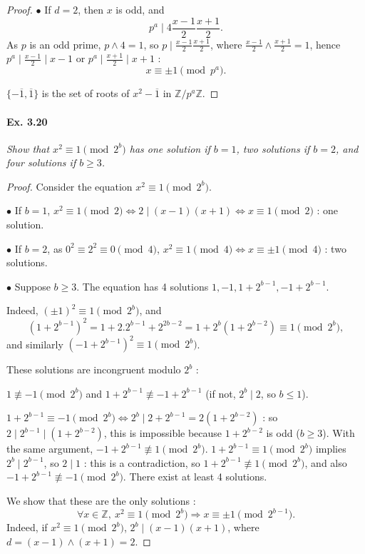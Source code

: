 \documentclass[11pt,a4paper]{article}
\newcommand{\Z}{\mathbb{Z}}
\begin{document}
{\begin{proof}
$\bullet$ If $d=2$, then $x$ is odd, and
$$p^a \mid 4 \frac{x-1}{2}\frac{x+1}{2}.$$
As $p$ is an odd prime, $p\wedge 4 = 1$, so $p \mid  \frac{x-1}{2}\frac{x+1}{2}$, where  $\frac{x-1}{2}\wedge \frac{x+1}{2} = 1$, hence $p^a \mid  \frac{x-1}{2} \mid x-1$ or $p^a \mid  \frac{x+1}{2} \mid x+1$ : $$x\equiv \pm 1 \pmod {p^a}.$$

$\{-\overline{1},\overline{1}\}$ is the set of roots of $x^2-\overline{1}$ in $\Z/p^a\Z$.
\end{proof}

\paragraph{Ex. 3.20}

{\it Show that $x^2 \equiv 1 \pmod {2^b}$ has one solution if $b = 1$, two solutions if $b = 2$, and four solutions if $b \geq 3$.
}

\begin{proof} Consider the equation $x^2 \equiv 1\pmod{2^b}$.

$\bullet$ If $b=1$, $x^2 \equiv 1\pmod{2} \iff 2 \mid (x-1)(x+1) \iff x\equiv 1 \pmod 2$ : one solution.

$\bullet$ If $b=2$, as $0^2 \equiv 2^2 \equiv 0 \pmod 4$, $x^2 \equiv 1\pmod{4} \iff x\equiv \pm 1 \pmod 4$ : two solutions.

$\bullet$ Suppose $b\geq 3$. The equation has 4 solutions $1,-1,1+2^{b-1}, -1+2^{b-1}$.

Indeed, $(\pm1)^2 \equiv 1 \pmod {2^b}$, and
$$(1+2^{b-1})^2 = 1 + 2.2^{b-1} + 2^{2b-2} = 1+2^b(1+2^{b-2}) \equiv 1 \pmod{2^b},$$ and similarly $(-1+2^{b-1})^2 \equiv 1 \pmod{2^b}$.

These solutions are incongruent modulo $2^b$ : 

$1 \not \equiv -1 \pmod {2^b}$ and $1+2^{b-1}\not \equiv -1+2^{b-1}$ (if not, $2^b \mid 2$, so $b\leq 1$).

$1 + 2^{b-1} \equiv -1 \pmod {2^b} \iff 2^b \mid 2 +2^{b-1} = 2(1 + 2^{b-2})$ : so  $2 \mid 2^{b-1} \mid (1+ 2^{b-2})$, this is impossible because $1+ 2^{b-2}$ is odd ($b\geq 3$). With the same argument, $-1 + 2^{b-1} \not \equiv 1 \pmod{2^b}$. $1 + 2^{b-1} \equiv 1  \pmod{2^b}$ implies $2^{b} \mid 2^{b-1}$, so $2\mid 1$ : this is a contradiction, so $1 + 2^{b-1} \not \equiv 1  \pmod{2^b}$, and also $-1 + 2^{b-1} \not \equiv -1  \pmod{2^b}$. There exist at least 4 solutions.

We show that these are the only solutions : 
$$ \forall x \in \Z,\ x^2 \equiv 1 \pmod{2^b} \Rightarrow x \equiv \pm 1 \pmod{2^{b-1}}.$$
Indeed, if $x^2 \equiv 1 \pmod{2^b} $, $2^b \mid (x-1)(x+1)$, where $d =(x-1) \wedge (x+1) = 2$. 


\end{proof}}
\end{document}
